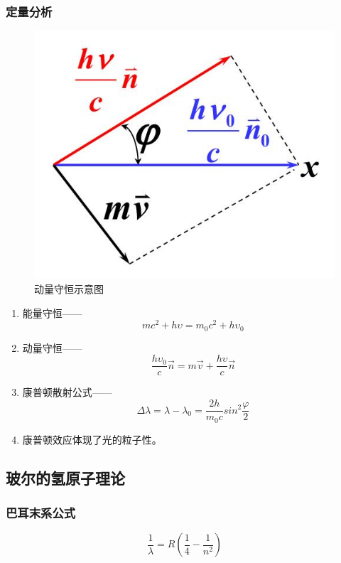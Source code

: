 \documentclass{ctexart}
\begin{document}
\subsubsection{定量分析}

\begin{figure}[h]
	\centering
	\includegraphics[scale=0.3]{images//chapter_15//figure_15.2.jpg} 
	\caption{动量守恒示意图}\label{figure15.2}
\end{figure}

\begin{enumerate}
	\item 能量守恒——
	$$mc^2+h\upsilon =m_0c^2+h\upsilon_0$$
	\item 动量守恒——
	$$\frac{h\upsilon_0}{c}\vec{n}=m\vec{v}+\frac{h\upsilon}{c}\vec{n}$$
	\item 康普顿散射公式——
	$$\Delta \lambda=\lambda-\lambda_0=\frac{2h}{m_0c}sin^2\frac{\varphi}{2}$$
	\item 康普顿效应体现了光的粒子性。
\end{enumerate}

\subsection{玻尔的氢原子理论}

\subsubsection{巴耳末系公式}

$$\frac{1}{\lambda}=R(\frac{1}{4}-\frac{1}{n^2})$$
\end{document}

